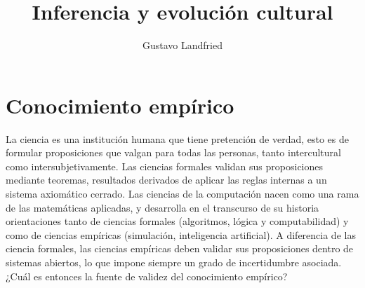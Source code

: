 \documentclass[a4paper,10pt]{book}
\title{\huge Inferencia y evolución cultural}
\author{Gustavo Landfried}
\begin{document}
\maketitle

\tableofcontents



\chapter{Conocimiento empírico}

La ciencia es una institución humana que tiene pretención de verdad, esto es de formular proposiciones que valgan para todas las personas, tanto intercultural como intersubjetivamente.
Las ciencias formales validan sus proposiciones mediante teoremas, resultados derivados de aplicar las reglas internas a un sistema axiomático cerrado.
Las ciencias de la computación nacen como una rama de las matemáticas aplicadas, y desarrolla en el transcurso de su historia orientaciones tanto de ciencias formales (algoritmos, lógica y computabilidad) y como de ciencias empíricas (simulación, inteligencia artificial).
A diferencia de las ciencia formales, las ciencias empíricas deben validar sus proposiciones dentro de sistemas abiertos, lo que impone siempre un grado de incertidumbre asociada.
¿Cuál es entonces la fuente de validez del conocimiento empírico?
\end{document}
